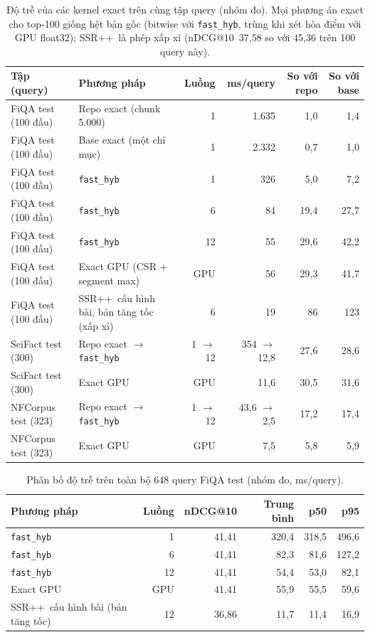 \documentclass[a4paper,13pt]{extreport}
\makeatletter
\theoremstyle{plain}
\newcommand{\ssrpp}{SSR++}
\newcommand{\ndcg}{nDCG@10}
\newcommand{\fasthyb}{\texttt{fast\_hyb}}
\makeatother
\begin{document}
\begin{table}[htbp]
\centering
\caption[Độ trễ của các kernel exact trên cùng tập query (nhóm đo)]{Độ trễ của các kernel exact trên cùng tập query (nhóm đo). Mọi phương án exact cho top-100 giống hệt bản gốc (bitwise với \fasthyb, trùng khi xét hòa điểm với GPU float32); \ssrpp\ là phép xấp xỉ (\ndcg\ 37,58 so với 45,36 trên 100 query này).}
\label{tab:opt-same100}
\footnotesize
\begin{tabular}{p{2.5cm}p{4.6cm}rrrr}
\toprule
\textbf{Tập (query)} & \textbf{Phương pháp} & \textbf{Luồng} & \textbf{ms/query} & \textbf{So với repo} & \textbf{So với base}\\
\midrule
FiQA test (100 đầu) & Repo exact (chunk 5.000) & 1 & 1.635 & 1,0 & 1,4\\
FiQA test (100 đầu) & Base exact (một chỉ mục) & 1 & 2.332 & 0,7 & 1,0\\
FiQA test (100 đầu) & \fasthyb & 1 & 326 & 5,0 & 7,2\\
FiQA test (100 đầu) & \fasthyb & 6 & 84 & 19,4 & 27,7\\
FiQA test (100 đầu) & \fasthyb & 12 & 55 & 29,6 & 42,2\\
FiQA test (100 đầu) & Exact GPU (CSR + segment max) & GPU & 56 & 29,3 & 41,7\\
FiQA test (100 đầu) & \ssrpp\ cấu hình bài, bản tăng tốc (xấp xỉ) & 6 & 19 & 86 & 123\\
\midrule
SciFact test (300) & Repo exact $\to$ \fasthyb & 1 $\to$ 12 & 354 $\to$ 12,8 & 27,6 & 28,6\\
SciFact test (300) & Exact GPU & GPU & 11,6 & 30,5 & 31,6\\
NFCorpus test (323) & Repo exact $\to$ \fasthyb & 1 $\to$ 12 & 43,6 $\to$ 2,5 & 17,2 & 17,4\\
NFCorpus test (323) & Exact GPU & GPU & 7,5 & 5,8 & 5,9\\
\bottomrule
\end{tabular}
\end{table}

\begin{table}[htbp]
\centering
\caption{Phân bố độ trễ trên toàn bộ 648 query FiQA test (nhóm đo, ms/query).}
\label{tab:opt-dist}
\small
\begin{tabular}{lrrrrr}
\toprule
\textbf{Phương pháp} & \textbf{Luồng} & \textbf{\ndcg} & \textbf{Trung bình} & \textbf{p50} & \textbf{p95}\\
\midrule
\fasthyb & 1 & 41,41 & 320,4 & 318,5 & 496,6\\
\fasthyb & 6 & 41,41 & 82,3 & 81,6 & 127,2\\
\fasthyb & 12 & 41,41 & 54,4 & 53,0 & 82,1\\
Exact GPU & GPU & 41,41 & 55,9 & 55,5 & 59,6\\
\ssrpp\ cấu hình bài (bản tăng tốc) & 12 & 36,86 & 11,7 & 11,4 & 16,9\\
\bottomrule
\end{tabular}
\end{table}
\end{document}
